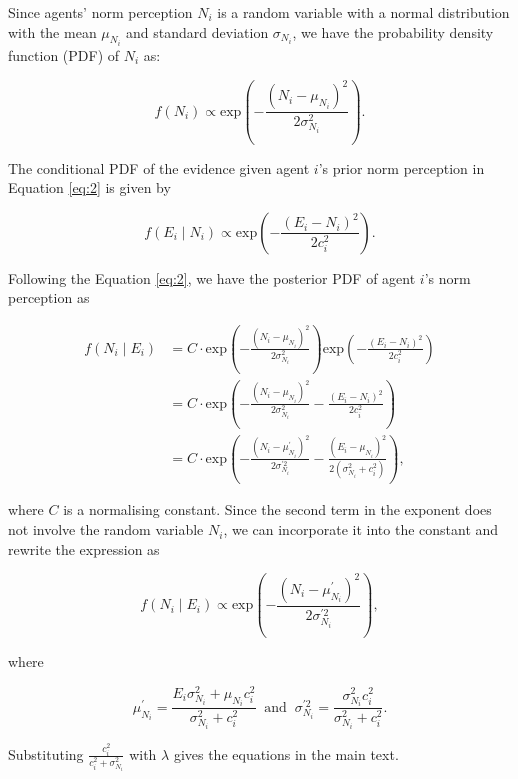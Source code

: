 \documentclass[
  11pt,
]{article}
\begin{document}
Since agents' norm perception \(N_i\) is a random variable with a normal
distribution with the mean \(\mu_{N_i}\) and standard deviation
\(\sigma_{N_i}\), we have the probability density function (PDF) of
\(N_i\) as:

\begin{equation*}
f(N_i) \propto \text{exp}(-\frac{(N_i - \mu_{N_i})^2}{2\sigma_{N_i}^2}).
\end{equation*}

The conditional PDF of the evidence given agent \(i\)'s prior norm
perception in Equation \ref{eq:2} is given by

\begin{equation*}
f(E_i \mid N_i) \propto \text{exp}(-\frac{(E_i - N_i)^2}{2c_i^2}).
\end{equation*}

Following the Equation \ref{eq:2}, we have the posterior PDF of agent
\(i\)'s norm perception as

\begin{equation*}
  \begin{aligned}
    f(N_i \mid E_i) &= C \cdot \text{exp}(-\frac{(N_i - \mu_{N_i})^2}{2\sigma_{N_i}^2}) \text{exp}(- \frac{(E_i - N_i)^2}{2c_i^2})\\
      &= C \cdot \text{exp}(-\frac{(N_i - \mu_{N_i})^2}{2\sigma_{N_i}^2} - \frac{(E_i - N_i)^2}{2c_i^2})\\
      &= C \cdot \text{exp}(- \frac{(N_i - \mu_{N_i}^{\prime})^2}{2\sigma_{N_i}^{\prime2}} - \frac{(E_i - \mu_{N_i})^2}{2(\sigma_{N_i}^2 + c_i^2)}),
  \end{aligned}
\end{equation*}

where \(C\) is a normalising constant. Since the second term in the
exponent does not involve the random variable \(N_i\), we can
incorporate it into the constant and rewrite the expression as

\begin{equation*}
  f(N_i \mid E_i) \propto \text{exp}(- \frac{(N_i - \mu_{N_i}^{\prime})^2}{2\sigma_{N_i}^{\prime2}}),
\end{equation*}

where

\begin{equation*}
  \mu_{N_i}^{\prime} = \frac{E_i \sigma_{N_i}^2 + \mu_{N_i} c_i^2}{\sigma_{N_i}^2 + c_i^2} \;\; \text{and} \;\; \sigma_{N_i}^{\prime2} = \frac{\sigma_{N_i}^2 c_i^2}{\sigma_{N_i}^2 + c_i^2}.
\end{equation*}

Substituting \(\frac{c_i^2}{c_i^2 + \sigma_{N_i}^2}\) with \(\lambda\)
gives the equations in the main text.
\end{document}
